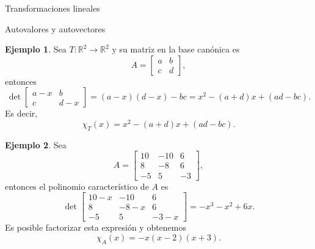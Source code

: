 \documentclass[a4paper,12pt,twoside,spanish,reqno]{amsbook}
\theoremstyle{definition}
\newtheorem{ejemplo}{Ejemplo}[section]
\theoremstyle{remark}
\newcommand{\R}{\mathbb R}
\begin{document}
\begin{chapter}{Transformaciones lineales}
\begin{section}{Autovalores y autovectores}
        \begin{ejemplo}
            Sea $T: \R^2 \to \R^2$ y su matriz en la base canónica es
            \begin{equation*}
                A = \begin{bmatrix}
                    a&b\\c&d
                \end{bmatrix},
            \end{equation*}
        entonces
        \begin{equation*}
                 \det \begin{bmatrix}
                a-x & b \\ c &d-x
                \end{bmatrix} = 
                (a-x)(d-x) - bc = x^2 -(a+d)x + (ad -bc).
        \end{equation*}
        Es decir,
        $$
        \chi_T(x) = x^2 -(a+d)x + (ad -bc).
        $$ 
        \end{ejemplo}

    
    
        
        \begin{ejemplo} \label{ej-autovectores}
            Sea
            $$ 
            A=\begin{bmatrix}10&-10&6\\8& -8& 6\\-5& 5& -3\end{bmatrix},
            $$
            entonces el  polinomio característico de $A$ es
            $$
            \det \begin{bmatrix}10-x&-10&6\\8& -8-x& 6\\-5& 5& -3-x\end{bmatrix} = -x^3  - x^2 + 6 x .
            $$
            Es posible factorizar esta expresión y obtenemos
            $$
            \chi_A(x) = -x (x-2)(x+3).
            $$
        \end{ejemplo}
        
    \begin{comment}
        \begin{ejemplo}
        Sea
        $$ 
        A=\begin{bmatrix}1&2&1\\ 6&-1&0\\ -1&-2&-1\end{bmatrix},
        $$
        entonces el  polinomio característico de $A$ es
        $$
        \det \begin{bmatrix}1-x&2&1\\ 6&-1-x&0\\ -1&-2&-1-x\end{bmatrix} = -x^3 - x^2 + 12 x.
        $$
        Es posible factorizar esta expresión y obtenemos
        $$
        \chi_A(x) = -x(x-3)(x+4).
        $$
        \end{ejemplo}
    \end{comment}	
        

\end{section}
\end{chapter}
\end{document}
